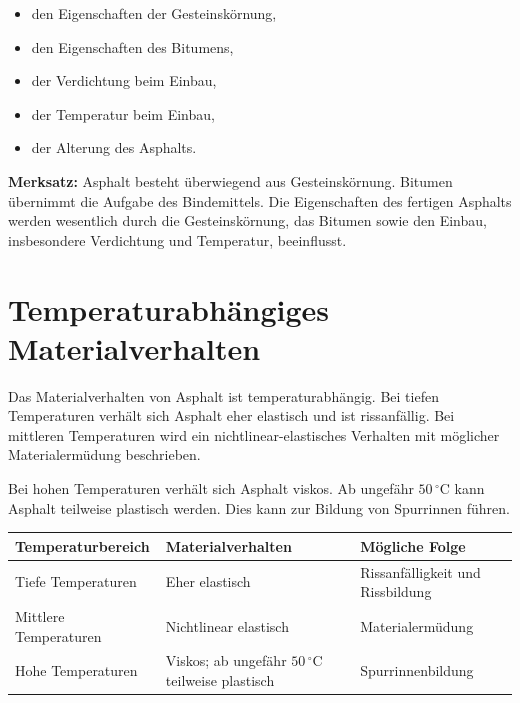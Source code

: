 \documentclass[
  12pt,
  a4paper,
  oneside
]{scrreprt}
\begin{document}
\begin{itemize}
  \item den Eigenschaften der Gesteinskörnung,
  \item den Eigenschaften des Bitumens,
  \item der Verdichtung beim Einbau,
  \item der Temperatur beim Einbau,
  \item der Alterung des Asphalts.
\end{itemize}



\begin{merksatzbox}
\textbf{Merksatz:}
Asphalt besteht überwiegend aus Gesteinskörnung. Bitumen übernimmt die
Aufgabe des Bindemittels. Die Eigenschaften des fertigen Asphalts
werden wesentlich durch die Gesteinskörnung, das Bitumen sowie den
Einbau, insbesondere Verdichtung und Temperatur, beeinflusst.

\end{merksatzbox}

\section{Temperaturabhängiges Materialverhalten}

Das Materialverhalten von Asphalt ist temperaturabhängig. Bei tiefen
Temperaturen verhält sich Asphalt eher elastisch und ist rissanfällig.
Bei mittleren Temperaturen wird ein nichtlinear-elastisches Verhalten
mit möglicher Materialermüdung beschrieben.


Bei hohen Temperaturen verhält sich Asphalt viskos. Ab ungefähr
$50\,^\circ\mathrm{C}$ kann Asphalt teilweise plastisch werden. Dies
kann zur Bildung von Spurrinnen führen.


\begin{longtable}{
  >{\raggedright\arraybackslash}p{}
  >{\raggedright\arraybackslash}p{}
  >{\raggedright\arraybackslash}p{}
}
\toprule
\textbf{Temperaturbereich} &
\textbf{Materialverhalten} &
\textbf{Mögliche Folge} \\
\midrule
\endhead

Tiefe Temperaturen &
Eher elastisch &
Rissanfälligkeit und Rissbildung \\

Mittlere Temperaturen &
Nichtlinear elastisch &
Materialermüdung \\

Hohe Temperaturen &
Viskos; ab ungefähr $50\,^\circ\mathrm{C}$ teilweise plastisch &
Spurrinnenbildung \\

\bottomrule
\end{longtable}
\end{document}
